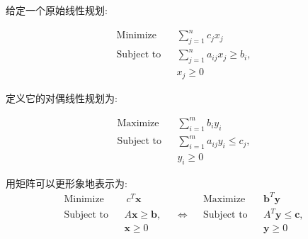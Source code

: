 给定一个原始线性规划:

$$
\begin{aligned}
\text{Minimize}&&\sum_{j=1}^n c_j x_j\\
\text{Subject to}&&\sum_{j=1}^n a_{ij} x_j\ge b_i,\\
&&x_j\ge 0
\end{aligned}
$$

定义它的对偶线性规划为:

$$
\begin{aligned}
\text{Maximize}&&\sum_{i=1}^m b_i y_i\\
\text{Subject to}&&\sum_{i=1}^m a_{ij} y_i\le c_j,\\
&&y_i\ge 0
\end{aligned}
$$

用矩阵可以更形象地表示为:
$$
\begin{aligned}
\text{Minimize}&& \ c^T \boldsymbol x &&&& \text{Maximize} && \boldsymbol b^{T}\boldsymbol y\\
\text{Subject to}&& A\boldsymbol x \ge \boldsymbol b, && \Longleftrightarrow && \text{Subject to} && A^T\boldsymbol y \le \boldsymbol c,\\
&& \boldsymbol x\ge 0 &&&&&& \boldsymbol y\ge 0
\end{aligned}
$$
